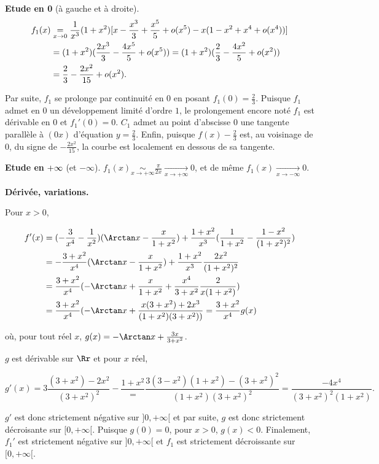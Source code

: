 {\begin{enumerate}
{\textbf{Etude en 0} (à gauche et à droite).
\begin{align*}\ensuremath
f_1(x)&\underset{x\rightarrow0}{=}\frac{1}{x^3}(1+x^2)[x-\frac{x^3}{3}+\frac{x^5}{5}+o(x^5)-x(1-x^2+x^4+o(x^4))]\\
 &=(1+x^2)(\frac{2x^3}{3}-\frac{4x^5}{5}+o(x^5))=(1+x^2)(\frac{2}{3}-\frac{4x^2}{5}+o(x^2))\\
 &=\frac{2}{3}-\frac{2x^2}{15}+o(x^2).
\end{align*}

Par suite, $f_1$ se prolonge par continuité en $0$ en posant $f_1(0)=\frac{2}{3}$. Puisque $f_1$ admet en $0$ un développement limité d'ordre $1$, le prolongement encore noté $f_1$ est dérivable en $0$ et $f_1'(0)=0$. $C_1$ admet au point d'abscisse $0$ une tangente parallèle à $(0x)$ d'équation $y=\frac{2}{3}$. Enfin, puisque  $f(x)-\frac{2}{3}$ est, au voisinage de $0$, du signe de $-\frac{2x^2}{15}$, la courbe est localement en dessous de sa tangente.

\textbf{Etude en} $\bf{+\infty}$ (et $-\infty$). $f_1(x)\underset{x\rightarrow+\infty}{\sim}\frac{\pi}{2x}\underset{x\rightarrow+\infty}{\rightarrow}0$, et de même $f_1(x)\underset{x\rightarrow-\infty}{\rightarrow}0$.

\textbf{Dérivée, variations.}

Pour $x>0$, 

\begin{align*}\ensuremath
f'(x)&=(-\frac{3}{x^4}-\frac{1}{x^2})
(\Arctan x-\frac{x}{1+x^2})+\frac{1+x^2}{x^3}(\frac{1}{1+x^2}-\frac{1-x^2}{(1+x^2)^2})\\
 &=-\frac{3+x^2}{x^4}(\Arctan x-\frac{x}{1+x^2})+\frac{1+x^2}{x^3}\frac{2x^2}{(1+x^2)^2}\\
 &=\frac{3+x^2}{x^4}(-\Arctan x+\frac{x}{1+x^2}+\frac{x^4}{3+x^2}\frac{2}{x(1+x^2)})\\
 &=\frac{3+x^2}{x^4}(-\Arctan x+\frac{x(3+x^2)+2x^3}{(1+x^2)(3+x^2))}=\frac{3+x^2}{x^4}g(x)
\end{align*}

où, pour tout réel $x$, $g(x)=-\Arctan x+\frac{3x}{3+x^2}$.

$g$ est dérivable sur $\Rr$ et pour $x$ réel,

$$g'(x)=3\frac{(3+x^2)-2x^2}{(3+x^2)^2}-\frac{1+x^2}=\frac{3(3-x^2)(1+x^2)-(3+x^2)^2}{(1+x^2)(3+x^2)^2}=\frac{-4x^4}{(3+x^2)^2(1+x^2)}.$$

$g'$ est donc strictement négative sur $]0,+\infty[$ et par suite, $g$ est donc strictement décroisante sur $[0,+\infty[$. Puisque $g(0)=0$, pour $x>0$, $g(x)<0$. Finalement, $f_1'$ est strictement négative sur $]0,+\infty[$ et $f_1$ est strictement décroissante sur $[0,+\infty[$.

}
\end{enumerate}}
